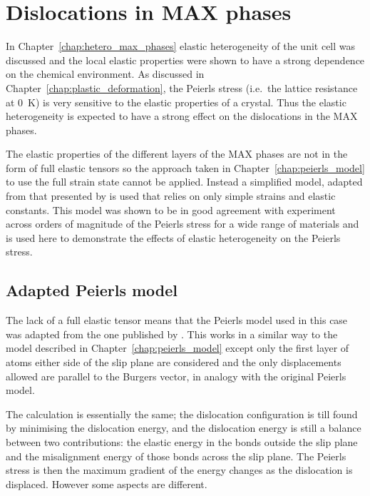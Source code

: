 
\chapter{Dislocations in MAX phases}

\label{chap:dislocations_in_max_phases}
\graphicspath{{dislocations_in_max_phases/Figs/}}






In Chapter~\ref{chap:hetero_max_phases} elastic heterogeneity of the unit cell was discussed and the local elastic properties were shown to have a strong dependence on the chemical environment. As discussed in  Chapter~\ref{chap:plastic_deformation}, the Peierls stress (i.e.\ the lattice resistance at \SI{0}{\kelvin}) is very sensitive to the elastic properties of a crystal. Thus the elastic heterogeneity is expected to have a strong effect on the dislocations in the MAX phases.

The elastic properties of the different layers of the MAX phases are not in the form of full elastic tensors so the approach taken in Chapter~\ref{chap:peierls_model} to use the full strain state cannot be applied. Instead a simplified model, adapted from that presented by \citet{Clegg2006} is used that relies on only simple strains and elastic constants. This model was shown to be in good agreement with experiment across orders of magnitude of the Peierls stress for a wide range of materials and is used here to demonstrate the effects of elastic heterogeneity on the Peierls stress.


\section{Adapted Peierls model}

The lack of a full elastic tensor means that the Peierls model used in this case was adapted from the one published by \cite{Clegg2006}. This works in a similar way to the model described in Chapter~\ref{chap:peierls_model} except only the first layer of atoms either side of the slip plane are considered and the only displacements allowed are parallel to the Burgers vector, in analogy with the original Peierls model.

The calculation is essentially the same; the dislocation configuration is till found by minimising the dislocation energy, and the dislocation energy is still a balance between two contributions: the elastic energy in the bonds outside the slip plane and the misalignment energy of those bonds across the slip plane. The Peierls stress is then the maximum gradient of the energy changes as the dislocation is displaced. However some aspects are different.


